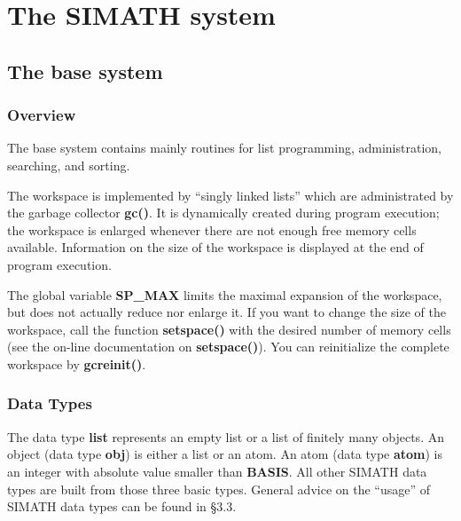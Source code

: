 % 
% 

\chapter{The SIMATH system}


\section{The base system}
\subsection{Overview}
The base system contains mainly routines for list programming, administration,
searching, and sorting.

The workspace is implemented by ``singly linked lists'' which
are administrated by the garbage collector {\bf gc()}. It is dynamically
created during program execution; the workspace is enlarged whenever there
are not enough free memory cells available. Information on the size of the
workspace is displayed at the end of program execution.

The global variable {\bf SP\_MAX} limits the maximal expansion of the workspace,
but does not actually reduce nor enlarge it. If you want to change the size of
the workspace, call the function {\bf setspace()} with the desired number of
memory cells (see the on-line documentation on {\bf setspace()}). You can 
reinitialize the complete workspace by {\bf gcreinit()}.

\subsection{Data Types}
The data type {\bf list} represents an empty list or a list of finitely
many objects. An object (data type {\bf obj}) is either a list or an
atom. An atom (data type {\bf atom}) is an integer with absolute value
smaller than {\bf BASIS}. All other SIMATH data types are built from
those three basic types. General advice on the ``usage'' of SIMATH data types
can be found in \S 3.3.

